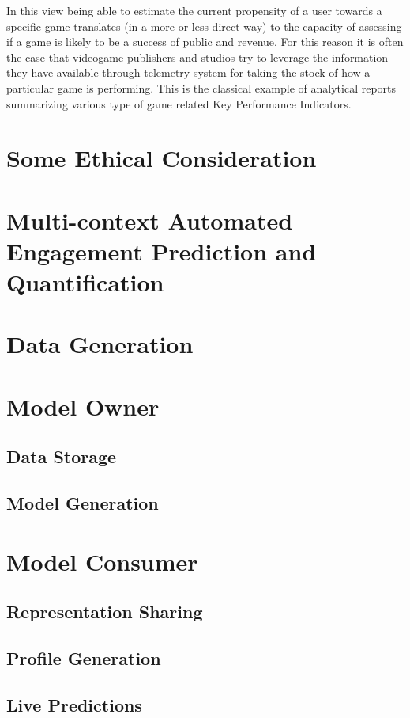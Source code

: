 In this view being able to estimate the current propensity of a user towards a specific game translates (in a more or less direct way) to the capacity of assessing if a game is likely to be a success of public and revenue. For this reason it is often the case that videogame publishers and studios try to leverage the information they have available through telemetry system for taking the stock of how a particular game is performing. This is the classical example of analytical reports summarizing various type of game related Key Performance Indicators. 

\section{Some Ethical Consideration}
\label{industry_needs}
\lorem

\section{Multi-context Automated Engagement Prediction and Quantification}
\label{industry_needs}

\section{Data Generation}
\lorem
\section{Model Owner}
\lorem
\subsection{Data Storage}
\lorem
\subsection{Model Generation}
\lorem
\section{Model Consumer}
\lorem
\subsection{Representation Sharing}
\lorem
\subsection{Profile Generation}
\lorem
\subsection{Live Predictions}
\lorem
